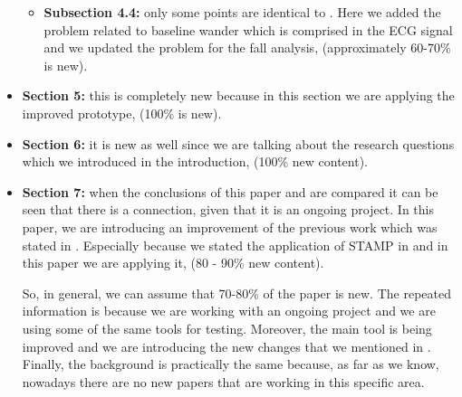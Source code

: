 \documentclass[parskip]{scrartcl}
\begin{document}
\begin{itemize}
\begin{itemize}
		\item  \textbf{Subsection 4.4:} only some points are identical to \cite{LorenaFall}. Here we added the problem related to baseline wander which is comprised in the ECG signal and we updated the problem for the fall analysis, (approximately 60-70\% is new).
	\end{itemize}
	\item \textbf{Section 5:} this is completely new because in this section we are applying the improved prototype, (100\% is new).
	\item \textbf{Section 6:} it is new as well since we are talking about the research questions which we introduced in the introduction, (100\% new content).
	\item \textbf{Section 7:} when the conclusions of this paper and \cite{LorenaFall} are compared it can be seen that there is a connection, given that it is an ongoing project. In this paper, we are introducing an improvement of the previous work which was stated in \cite{LorenaFall}. Especially because we stated the application of STAMP in \cite{LorenaFall} and in this paper we are applying it, (80 - 90\% new content).
	
	So, in general, we can assume that 70-80\% of the paper is new. The repeated information is because we are working with an ongoing project and we are using some of the same tools for testing. Moreover, the main tool is being improved and we are introducing the new changes that we mentioned in \cite{LorenaFall}. Finally, the background is practically the same because, as far as we know, nowadays there are no new papers that are working in this specific area.
	
	
	
	
\end{itemize}



\end{document}
